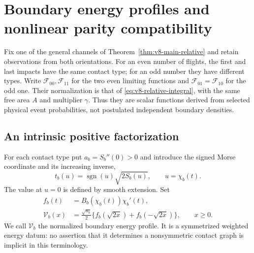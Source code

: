 \section{Boundary energy profiles and nonlinear parity compatibility}
\label{sec:v9-compatibility}
Fix one of the general channels of Theorem~\ref{thm:v8-main-relative}
and retain observations from both orientations. For an even number of
flights, the first and last impacts have the same contact type; for an
odd number they have different types. Write
$\mathcal F_{00},\mathcal F_{11}$ for the two even limiting functions
and $\mathcal F_{01}=\mathcal F_{10}$ for the odd one. Their
normalization is that of \eqref{eq:v8-relative-integral}, with the
same free area $A$ and multiplier $\gamma$. Thus they are scalar
functions derived from selected physical event probabilities, not
postulated independent boundary densities.

\subsection{An intrinsic positive factorization}
For each contact type put $a_b=S_b''(0)>0$ and introduce the signed
Morse coordinate and its increasing inverse,
\[
 t_b(u)=\operatorname{sgn}(u)\sqrt{2S_b(u)},\qquad u=\chi_b(t).
\]
The value at $u=0$ is defined by smooth extension. Set
\begin{equation}\label{eq:v9-energy-profile}
 \begin{split}
 f_b(t)&=B_b(\chi_b(t))\chi_b'(t),\\
 \mathcal V_b(x)&=\frac{\sqrt{a_b}}2
            \{f_b(\sqrt{2x})+f_b(-\sqrt{2x})\},\qquad x\ge0.
 \end{split}
\end{equation}
We call $\mathcal V_b$ the normalized boundary energy profile. It is
a symmetrized weighted energy datum: no assertion that it determines
a nonsymmetric contact graph is implicit in this terminology.

